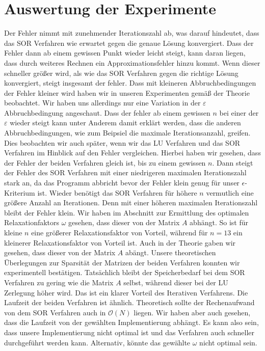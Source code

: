 \documentclass[smallheadings]{scrartcl}
\theoremstyle{definition}
\begin{document}
\section{Auswertung der Experimente}

Der Fehler nimmt mit zunehmender Iterationszahl ab, was darauf hindeutet, dass das SOR Verfahren wie erwartet gegen die genaue Lösung konvergiert. Dass der Fehler dann ab einem gewissen Punkt wieder leicht steigt, kann daran liegen, dass durch weiteres Rechnen ein Approximationsfehler hinzu kommt.  Wenn dieser schneller größer wird, als wie das SOR Verfahren gegen die richtige Lösung konvergiert, steigt insgesamt der fehler.  Dass mit kleineren Abbruchbedingungen der Fehler kleiner wird haben wir in unseren Experimenten gemäß der Theorie beobachtet.  Wir haben uns allerdings nur eine Variation in der $\varepsilon$ Abbruchbedingung angeschaut. Dass der fehler ab einem gewissen $n$ bei einer der $\varepsilon$ wieder steigt kann unter Anderem damit erklärt werden, dass die anderen Abbruchbedingungen, wie zum Beipsiel die maximale Iterationsanzahl, greifen. Dies beobachten wir auch später, wenn wir das LU Verfahren und das SOR Verfahren im Hinblick auf den Fehler vergleichen. Hierbei haben wir gesehen, dass der Fehler der beiden Verfahren gleich ist,  bis zu einem gewissen $n$. Dann steigt der Fehler des SOR Verfahren mit einer niedrigeren maximalen Iterationszahl stark an, da das Programm abbricht bevor der Fehler klein genug für unser $\epsilon$-Kriterium ist.  Wieder benötigt das SOR Verfahren für höhere $n$ vermutlich eine größere Anzahl an Iterationen. Denn mit einer höheren maximalen Iterationszahl bleibt der Fehler klein. Wir haben im Abschnitt zur Ermittlung des optimalen Relaxationfaktors $\omega$ gesehen, dass dieser von der Matrix $A$ abhängt. So ist für kleine $n$ eine größerer Relaxationsfaktor von Vorteil, während für $n=13$ ein kleinerer Relaxationsfaktor von Vorteil ist. Auch in der Theorie gaben wir gesehen, dass dieser von der Matrix $A$ abängt.  Unsere theoretischen Überlegungen zur Sparsität der Matrizen der beiden Verfahren konnten wir experimentell bestätigen. Tatsächlich bleibt der Speicherbedarf bei dem SOR Verfahren zu gering wie die Matrix $A$ selbst, während dieser bei der LU Zerlegung höher wird. Das ist ein klarer Vorteil des Iterativen Verfahrens. Die Laufzeit der beiden Verfahren ist ähnlich. Theoretisch sollte der Rechenaufwand von dem SOR Verfahren auch in $\mathcal{O}(N)$ liegen. Wir haben aber auch gesehen,  dass die Laufzeit von der gewählten Implementierung abhängt. Es kann also sein, dass unsere Implementierung nicht optimal ist und das Verfahren auch schneller durchgeführt werden kann.  Alternativ, könnte das gewählte $\omega $ nicht optimal sein.
\end{document}
